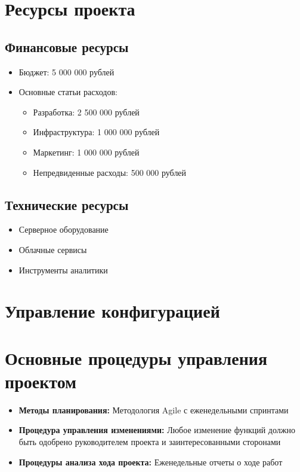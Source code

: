 \documentclass[14pt, russian]{matmex-diploma-custom}
\begin{document}
\section{Ресурсы проекта}
\subsection{Финансовые ресурсы}
\begin{itemize}
\item Бюджет: 5 000 000 рублей
\item Основные статьи расходов:
\begin{itemize}
\item Разработка: 2 500 000 рублей
\item Инфраструктура: 1 000 000 рублей
\item Маркетинг: 1 000 000 рублей
\item Непредвиденные расходы: 500 000 рублей
\end{itemize}
\end{itemize}

\subsection{Технические ресурсы}
\begin{itemize}
\item Серверное оборудование
\item Облачные сервисы
\item Инструменты аналитики
\end{itemize}

\section{Управление конфигурацией}

\section{Основные процедуры управления проектом}
\begin{itemize}
    \item \textbf{Методы планирования:} Методология Agile с еженедельными спринтами
    \item \textbf{Процедура управления изменениями:} Любое изменение функций должно быть одобрено руководителем проекта и заинтересованными сторонами
    \item \textbf{Процедуры анализа хода проекта:} Еженедельные отчеты о ходе работ
\end{itemize}
\end{document}
